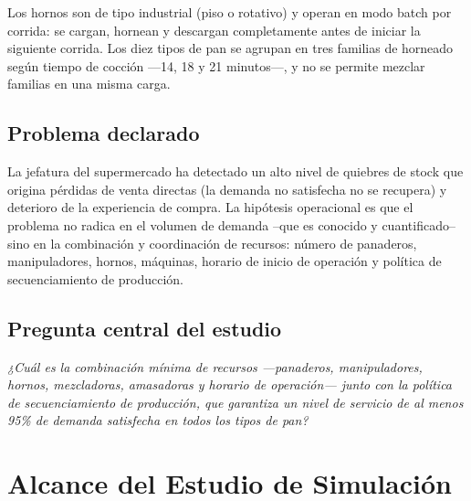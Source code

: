 \documentclass[12pt]{article}
\begin{document}
Los hornos son de tipo industrial (piso o rotativo) y operan en modo batch por corrida: se cargan, hornean y descargan completamente antes de iniciar la siguiente corrida. Los diez tipos de pan se agrupan en tres familias de horneado según tiempo de cocción ---14, 18 y 21 minutos---, y no se permite mezclar familias en una misma carga.

\subsection{Problema declarado}

La jefatura del supermercado ha detectado un alto nivel de quiebres de stock que origina pérdidas de venta directas (la demanda no satisfecha no se recupera) y deterioro de la experiencia de compra. La hipótesis operacional es que el problema no radica en el volumen de demanda --que es conocido y cuantificado-- sino en la combinación y coordinación de recursos: número de panaderos, manipuladores, hornos, máquinas, horario de inicio de operación y política de secuenciamiento de producción.

\subsection{Pregunta central del estudio}

\begin{center}
\colorbox{grisclaro}{%
\parbox{0.88\textwidth}{%
\vspace{4pt}
\textit{¿Cuál es la combinación mínima de recursos ---panaderos, manipuladores, hornos, mezcladoras, amasadoras y horario de operación--- junto con la política de secuenciamiento de producción, que garantiza un nivel de servicio de al menos 95\% de demanda satisfecha en todos los tipos de pan?}
\vspace{4pt}
}}
\end{center}
\newpage

\section{Alcance del Estudio de Simulación}
\end{document}

